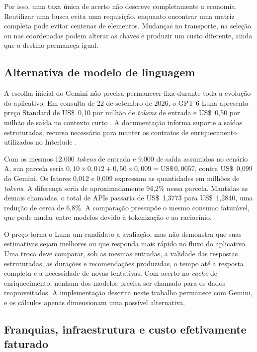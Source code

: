 Por isso, uma taxa única de acerto não descreve completamente a economia. Reutilizar uma busca evita uma requisição, enquanto encontrar uma matriz completa pode evitar centenas de elementos. Mudanças no transporte, na seleção ou nas coordenadas podem alterar as chaves e produzir um custo diferente, ainda que o destino permaneça igual.

\subsection{Alternativa de modelo de linguagem}
\label{sec:alternativa-llm}

A escolha inicial do Gemini não precisa permanecer fixa durante toda a evolução do aplicativo. Em consulta de 22 de setembro de 2026, o GPT-6 Luna apresenta preço Standard de US\$~0,10 por milhão de \textit{tokens} de entrada e US\$~0,50 por milhão de saída no contexto curto \cite{openai_precos2026}. A documentação informa suporte a saídas estruturadas, recurso necessário para manter os contratos de enriquecimento utilizados no Interlude \cite{openai_luna2026}.

Com os mesmos 12.000 \textit{tokens} de entrada e 9.000 de saída assumidos no cenário A, sua parcela seria $0{,}10\times0{,}012+0{,}50\times0{,}009=\text{US\$}\,0{,}0057$, contra US\$~0,099 do Gemini. Os fatores 0,012 e 0,009 expressam as quantidades em milhões de \textit{tokens}. A diferença seria de aproximadamente 94,2\% nessa parcela. Mantidas as demais chamadas, o total de APIs passaria de US\$~1,3773 para US\$~1,2840, uma redução de cerca de 6,8\%. A comparação pressupõe o mesmo consumo faturável, que pode mudar entre modelos devido à tokenização e ao raciocínio.

O preço torna o Luna um candidato a avaliação, mas não demonstra que suas estimativas sejam melhores ou que responda mais rápido no fluxo do aplicativo. Uma troca deve comparar, sob as mesmas entradas, a validade das respostas estruturadas, as durações e recomendações produzidas, o tempo até a resposta completa e a necessidade de novas tentativas. Com acerto no \textit{cache} de enriquecimento, nenhum dos modelos precisa ser chamado para os dados reaproveitados. A implementação descrita neste trabalho permanece com Gemini, e os cálculos apenas dimensionam uma possível alternativa.

\subsection{Franquias, infraestrutura e custo efetivamente faturado}

